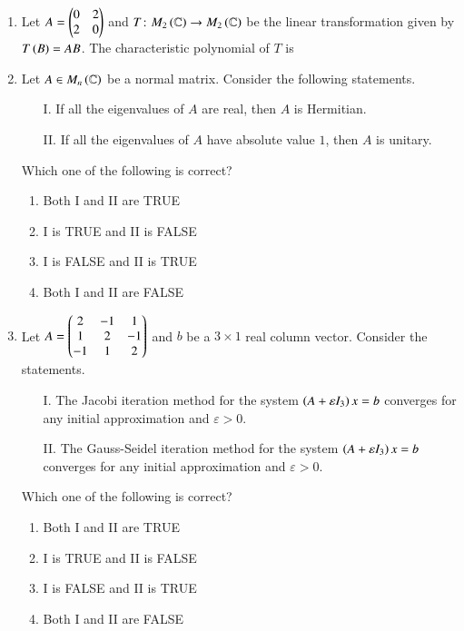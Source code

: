 \documentclass[journal,12pt,onecolumn]{IEEEtran}
\theoremstyle{remark}
\begin{document}
\begin{enumerate}
\item Let $A = \begin{pmatrix}0 & 2 \\ 2 & 0\end{pmatrix}$ and $T \colon M_2\left(\mathbb{C}\right) \to M_2\left(\mathbb{C}\right)$ be the linear transformation given by $T\left(B\right) = AB$. The characteristic polynomial of $T$ is \hfill{}
\begin{enumerate}
\end{enumerate}

\item Let $A \in M_n\left(\mathbb{C}\right)$ be a normal matrix. Consider the following statements.
\begin{enumerate}
    \item[I.] If all the eigenvalues of $A$ are real, then $A$ is Hermitian.
    \item[II.] If all the eigenvalues of $A$ have absolute value $1$, then $A$ is unitary.
\end{enumerate}
Which one of the following is correct? \hfill{}
\begin{enumerate}
    \item Both I and II are TRUE
    \item I is TRUE and II is FALSE
    \item I is FALSE and II is TRUE
    \item Both I and II are FALSE
\end{enumerate}

\item Let $A = \begin{pmatrix}2 & -1 & 1 \\ 1 & 2 & -1 \\ -1 & 1 & 2\end{pmatrix}$ and $b$ be a $3 \times 1$ real column vector. Consider the statements.
\begin{enumerate}
    \item[I.] The Jacobi iteration method for the system $\left(A + \varepsilon I_3\right)x = b$ converges for any initial approximation and $\varepsilon > 0$.
    \item[II.] The Gauss-Seidel iteration method for the system $\left(A + \varepsilon I_3\right)x = b$ converges for any initial approximation and $\varepsilon > 0$.
\end{enumerate}
Which one of the following is correct? \hfill{}
\begin{enumerate}
    \item Both I and II are TRUE
    \item I is TRUE and II is FALSE
    \item I is FALSE and II is TRUE
    \item Both I and II are FALSE
\end{enumerate}


\end{enumerate}
\end{document}
